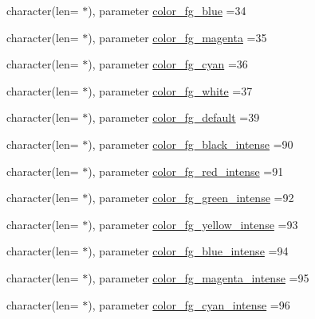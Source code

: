 \begin{DoxyCompactItemize}
\item 
character(len= $\ast$), parameter \mbox{\hyperlink{namespacem__escape_a01075e619c6af06aac80d73f32263439}{color\+\_\+fg\+\_\+blue}} =\textquotesingle{}34\textquotesingle{}
\item 
character(len= $\ast$), parameter \mbox{\hyperlink{namespacem__escape_ac56b264a4d6c5f3668bac32b791e54de}{color\+\_\+fg\+\_\+magenta}} =\textquotesingle{}35\textquotesingle{}
\item 
character(len= $\ast$), parameter \mbox{\hyperlink{namespacem__escape_a0bbc85c7110c9b67456884baafe31daf}{color\+\_\+fg\+\_\+cyan}} =\textquotesingle{}36\textquotesingle{}
\item 
character(len= $\ast$), parameter \mbox{\hyperlink{namespacem__escape_ae410339e5c6b5468a65e8ce193941ea4}{color\+\_\+fg\+\_\+white}} =\textquotesingle{}37\textquotesingle{}
\item 
character(len= $\ast$), parameter \mbox{\hyperlink{namespacem__escape_aaeff9968bb1e29198469d5d8109e5f41}{color\+\_\+fg\+\_\+default}} =\textquotesingle{}39\textquotesingle{}
\item 
character(len= $\ast$), parameter \mbox{\hyperlink{namespacem__escape_a75d8856bae4a4b8875d48ce2e3a3409a}{color\+\_\+fg\+\_\+black\+\_\+intense}} =\textquotesingle{}90\textquotesingle{}
\item 
character(len= $\ast$), parameter \mbox{\hyperlink{namespacem__escape_a9355532fa2ee17b47e72208480a86707}{color\+\_\+fg\+\_\+red\+\_\+intense}} =\textquotesingle{}91\textquotesingle{}
\item 
character(len= $\ast$), parameter \mbox{\hyperlink{namespacem__escape_a21c7f9b0377ba62dc353e09c05cc5f35}{color\+\_\+fg\+\_\+green\+\_\+intense}} =\textquotesingle{}92\textquotesingle{}
\item 
character(len= $\ast$), parameter \mbox{\hyperlink{namespacem__escape_a7fb2b231cf28bd2ffbf015d7430b46db}{color\+\_\+fg\+\_\+yellow\+\_\+intense}} =\textquotesingle{}93\textquotesingle{}
\item 
character(len= $\ast$), parameter \mbox{\hyperlink{namespacem__escape_a57cc52b1beef27fae861cae6448221fe}{color\+\_\+fg\+\_\+blue\+\_\+intense}} =\textquotesingle{}94\textquotesingle{}
\item 
character(len= $\ast$), parameter \mbox{\hyperlink{namespacem__escape_ac47d36c6fed693f69eff29d0046c8f20}{color\+\_\+fg\+\_\+magenta\+\_\+intense}} =\textquotesingle{}95\textquotesingle{}
\item 
character(len= $\ast$), parameter \mbox{\hyperlink{namespacem__escape_a58a755722e6672a1fe8ef98637540105}{color\+\_\+fg\+\_\+cyan\+\_\+intense}} =\textquotesingle{}96\textquotesingle{}

\end{DoxyCompactItemize}
